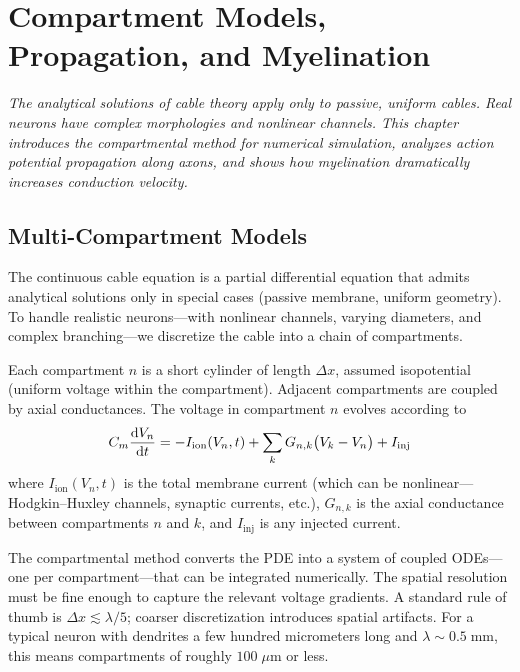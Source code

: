 \chapter{Compartment Models, Propagation, and Myelination}
\label{ch:compartments}

\textit{The analytical solutions of cable theory apply only to passive, uniform cables. Real neurons have complex morphologies and nonlinear channels. This chapter introduces the compartmental method for numerical simulation, analyzes action potential propagation along axons, and shows how myelination dramatically increases conduction velocity.}

\section{Multi-Compartment Models}
\label{sec:compartments}

The continuous cable equation is a partial differential equation that admits analytical solutions only in special cases (passive membrane, uniform geometry). To handle realistic neurons---with nonlinear channels, varying diameters, and complex branching---we discretize the cable into a chain of compartments.

Each compartment $n$ is a short cylinder of length $\Delta x$, assumed isopotential (uniform voltage within the compartment). Adjacent compartments are coupled by axial conductances. The voltage in compartment $n$ evolves according to
%
\begin{equation}
  C_m\frac{\mathop{}\!\mathrm{d} V_n}{\mathop{}\!\mathrm{d} t} = -I_{\text{ion}}(V_n, t) + \sum_k G_{n,k}\bigl(V_k - V_n\bigr) + I_{\text{inj}}
  \label{eq:compartment}
\end{equation}
%
where $I_{\text{ion}}(V_n, t)$ is the total membrane current (which can be nonlinear---Hodgkin--Huxley channels, synaptic currents, etc.), $G_{n,k}$ is the axial conductance between compartments $n$ and $k$, and $I_{\text{inj}}$ is any injected current.

The compartmental method converts the PDE into a system of coupled ODEs---one per compartment---that can be integrated numerically. The spatial resolution must be fine enough to capture the relevant voltage gradients. A standard rule of thumb is $\Delta x \lesssim \lambda/5$; coarser discretization introduces spatial artifacts. For a typical neuron with dendrites a few hundred micrometers long and $\lambda \sim 0.5\;\text{mm}$, this means compartments of roughly $100\;\mu\text{m}$ or less.

